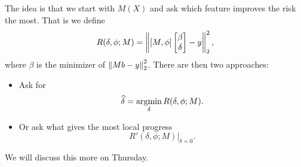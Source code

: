 The idea is that we start with $M(X)$ and ask which feature improves the risk the most. That is we define 
\[R(\delta,\phi; M) = \left\|[M,\phi]\begin{bmatrix}\beta\\ \delta \end{bmatrix} - y\right\|_2^2, \]
where $\beta$ is the minimizer of $\left\|Mb-y\right\|_2^2$. There are then two approaches:
\begin{itemize}
    \item Ask for
    \[\widehat{\delta} = \operatorname*{argmin}_\delta R(\delta, \phi;M).\]
    \item Or ask what gives the most local progress 
    \[R'(\delta,\phi;M)|_{\delta = 0}.\]
\end{itemize}
We will discuss this more on Thursday.

